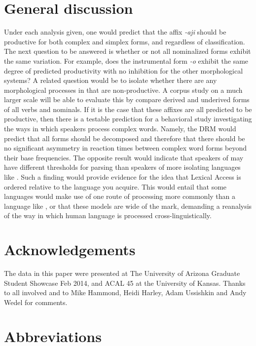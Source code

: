 \documentclass[output=paper,modfonts]{langscibook}
\begin{document}
\section{General discussion}\label{sec:kloehn:4}

Under each analysis given, one would predict that the affix \textit{-aji} should be productive for both complex and simplex  forms, and regardless of  classification. The next question to be answered is whether or not all nominalized forms exhibit the same variation. For example, does the instrumental form \textit{-o} exhibit the same degree of predicted productivity with no inhibition for the other morphological systems? A related question would be to isolate whether there are any morphological processes in  that are non-productive. A corpus study on a much larger scale will be able to evaluate this by compare derived and underived forms of all verbs and nominals. If it is the case that these affixes are all predicted to be productive, then there is a testable prediction for a behavioral study investigating the ways in which  speakers process complex words. Namely, the DRM would predict that all forms should be decomposed and therefore that there should be no significant asymmetry in reaction times between complex word forms beyond their base frequencies. The opposite result would indicate that speakers of  may have different thresholds for parsing than speakers of more isolating languages like . Such a finding would provide evidence for the idea that Lexical Access is ordered relative to the language you acquire. This would entail that some languages would make use of one route of processing more commonly than a language like , or that these models are wide of the mark, demanding a reanalysis of the way in which human language is processed cross-linguistically.

\section*{Acknowledgements}\label{sec:kloehn:5}

The data in this paper were presented at The University of Arizona Graduate Student Showcase Feb 2014, and ACAL 45 at the University of Kansas. Thanks to all involved and to Mike Hammond, Heidi Harley, Adam Ussishkin and Andy Wedel for comments.

\section*{Abbreviations}\label{sec:kloehn:6}
\end{document}
